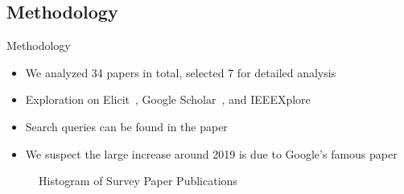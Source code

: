 
\subsection{Methodology}
\label{ssec:Methodology}

\begin{frame}{Methodology}
    \begin{multicols}{2}
        \begin{itemize}
            \setlength{\itemsep}{1.1ex}

            \item

            We analyzed 34 papers in total, selected 7 for detailed analysis

            \item

            Exploration on Elicit~\cite{elicit}, Google Scholar~\cite{googlescholar}, and
            IEEEXplore~\cite{ieeexplore}

            \item

            Search queries can be found in the paper

            \item

            We suspect the large increase around 2019 is due to Google's famous
             paper

        \end{itemize}

        \newcolumn

        \begin{figure}[h!]
            \caption{Histogram of Survey Paper Publications}
            \label{fig:Histogram-of-Survey-Paper-Publications}
        \end{figure}

    \end{multicols}
\end{frame}

